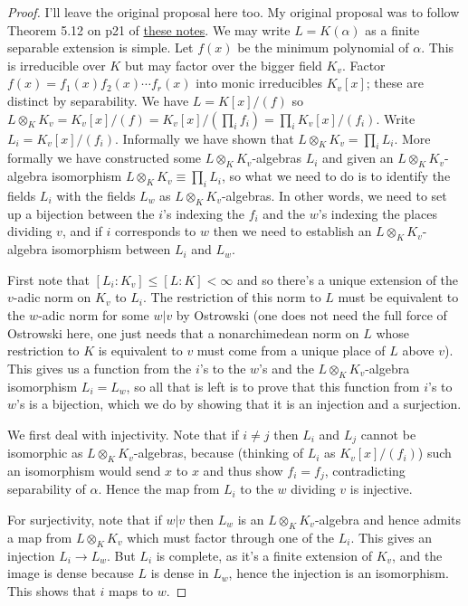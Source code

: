 \begin{proof}
  I'll leave the original proposal here too.
  My original proposal was to follow Theorem 5.12 on p21
  of \href{https://math.berkeley.edu/~ltomczak/notes/Mich2022/LF_Notes.pdf}
  {these notes}. We may write $L=K(\alpha)$ as a finite separable extension is simple. Let $f(x)$
  be the minimum polynomial of $\alpha$. This is irreducible over $K$ but may factor over
  the bigger field $K_v$. Factor $f(x)=f_1(x)f_2(x)\cdots f_r(x)$ into
  monic irreducibles $K_v[x]$; these are distinct by separability. We have $L=K[x]/(f)$
  so $L\otimes_KK_v=K_v[x]/(f)=K_v[x]/(\prod_i f_i)=\prod_i K_v[x]/(f_i)$. Write
  $L_i=K_v[x]/(f_i)$. Informally we have shown that $L\otimes_KK_v=\prod_i L_i$. More formally
  we have constructed some $L\otimes_KK_v$-algebras $L_i$ and given an $L\otimes_KK_v$-algebra
  isomorphism $L\otimes_KK_v\equiv \prod_i L_i$, so what we need to do
  is to identify the fields $L_i$ with the fields $L_w$ as $L\otimes_KK_v$-algebras.
  In other words, we need
  to set up a bijection between the $i$'s indexing the $f_i$ and the $w$'s indexing the
  places dividing $v$, and if $i$ corresponds to $w$ then we need to establish an
  $L\otimes_K K_v$-algebra isomorphism between $L_i$ and $L_w$.

  First note that $[L_i:K_v]\leq [L:K]<\infty$ and so there's a unique extension of the $v$-adic
  norm on $K_v$ to $L_i$. The restriction of this norm to $L$ must be equivalent to the $w$-adic
  norm for some $w|v$ by Ostrowski (one does not need the full force of Ostrowski here,
  one just needs that a nonarchimedean norm on $L$ whose restriction to $K$ is equivalent to $v$
  must come from a unique place of $L$ above $v$). This gives us a function from the $i$'s
  to the $w$'s and the $L\otimes_K K_v$-algebra isomorphism $L_i=L_w$, so all that is left is
  to prove that this function from $i$'s to $w$'s is a bijection, which we do by showing that
  it is an injection and a surjection.

  We first deal with injectivity. Note that if $i\not=j$ then $L_i$ and $L_j$ cannot be isomorphic
  as $L\otimes_KK_v$-algebras, because (thinking of $L_i$ as $K_v[x]/(f_i)$) such an isomorphism
  would send $x$ to $x$ and thus show $f_i=f_j$, contradicting separability of $\alpha$. Hence the map
  from $L_i$ to the $w$ dividing $v$ is injective.

  For surjectivity, note that if $w|v$ then $L_w$ is an $L\otimes_KK_v$-algebra and hence
  admits a map from $L\otimes_K K_v$ which must factor through one of the $L_i$.
  This gives an injection $L_i\to L_w$. But $L_i$ is complete, as it's a finite extension
  of $K_v$, and the image is dense because $L$ is dense in $L_w$, hence the injection
  is an isomorphism. This shows that $i$ maps to $w$.
\end{proof}

